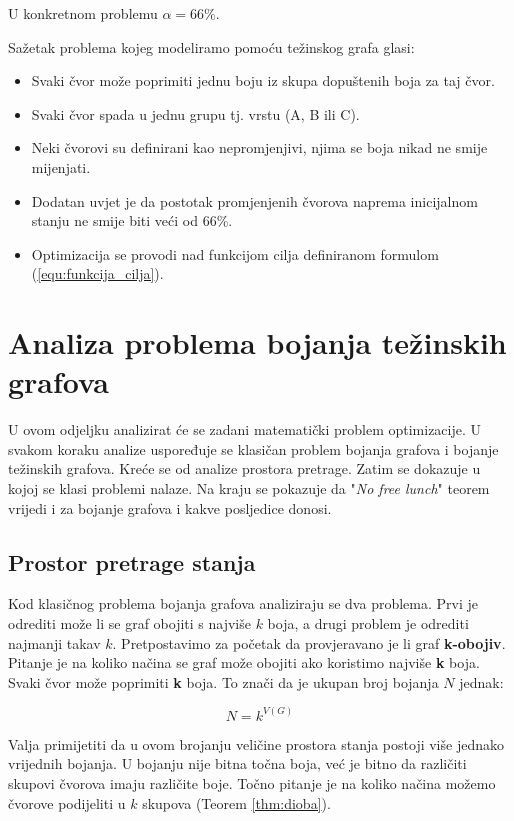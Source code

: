 \documentclass[times, utf8, diplomski, numeric]{fer}
\begin{document}
U konkretnom problemu $\alpha=66\%$.

Sažetak problema kojeg modeliramo pomoću težinskog grafa glasi:
\begin{itemize}
	\item Svaki čvor može poprimiti jednu boju iz skupa dopuštenih boja za taj čvor.
	\item Svaki čvor spada u jednu grupu tj. vrstu (A, B ili C).
	\item Neki čvorovi su definirani kao nepromjenjivi, njima se boja nikad ne smije mijenjati.
	\item Dodatan uvjet je da postotak promjenjenih čvorova naprema inicijalnom stanju ne smije biti veći od 66\%.
	\item Optimizacija se provodi nad funkcijom cilja definiranom formulom (\ref{equ:funkcija_cilja}).
\end{itemize}

\section{Analiza problema bojanja težinskih grafova}

U ovom odjeljku analizirat će se zadani matematički problem optimizacije. U svakom koraku analize uspoređuje se klasičan problem bojanja grafova i bojanje težinskih grafova. Kreće se od analize prostora pretrage. Zatim se dokazuje u kojoj se klasi problemi nalaze. Na kraju se pokazuje da "\emph{No free lunch}" teorem vrijedi i za bojanje grafova i kakve posljedice donosi.

\subsection{Prostor pretrage stanja}

Kod klasičnog problema bojanja grafova analiziraju se dva problema. Prvi je odrediti može li se graf obojiti s najviše $k$ boja, a drugi problem je odrediti najmanji takav $k$. Pretpostavimo za početak da provjeravano je li graf \textbf{k-obojiv}. Pitanje je na koliko načina se graf može obojiti ako koristimo najviše \textbf{k} boja. Svaki čvor može poprimiti \textbf{k} boja. To znači da je ukupan broj bojanja $N$ jednak: 

\begin{equation}
N = k^{V(G)} 
\end{equation}

Valja primijetiti da u ovom brojanju veličine prostora stanja postoji više jednako vrijednih bojanja. U bojanju nije bitna točna boja, već je bitno da različiti skupovi čvorova imaju različite boje. Točno pitanje je na koliko načina možemo čvorove podijeliti u $k$ skupova (Teorem \ref{thm:dioba}).  
\end{document}
